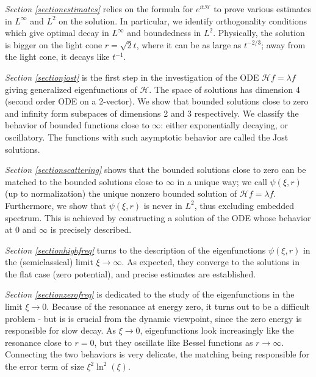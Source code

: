 \documentclass[11 pt]{amsart}
\theoremstyle{definition}
\theoremstyle{remark}
\numberwithin{equation}{section}
\begin{document}
\smallskip

\textit{Section \ref{sectionestimates}}
relies on the formula for $e^{it\mathcal{H}}$ to prove various estimates in $L^\infty$ and $L^2$ on the solution. In particular, we identify orthogonality conditions which give optimal decay in $L^\infty$ and boundedness in $L^2$. Physically, the solution is bigger on the light cone $r = \sqrt 2 t$, where it can be as large as $t^{-2/3}$; away from the light cone, it decays like $t^{-1}$.

\smallskip 

\textit{Section \ref{sectionjost}} is the first step in the investigation of the ODE $\mathcal{H} f = \lambda f$ giving generalized eigenfunctions of $\mathcal{H}$. The space of solutions has dimension 4 (second order ODE on a 2-vector). We show that bounded solutions close to zero and infinity form subspaces of dimensions 2 and 3 respectively. We classify the behavior of bounded functions close to $\infty$: either exponentially decaying, or oscillatory. The functions with such asymptotic behavior are called the Jost solutions.

\smallskip 

\textit{Section \ref{sectionscattering}} shows that the bounded solutions close to zero can be matched to the bounded solutions close to $\infty$ in a unique way; we call $\psi(\xi,r)$ (up to normalization) the unique nonzero bounded solution of $\mathcal{H} f = \lambda f$. Furthermore, we show that $\psi(\xi,r)$ is never in $L^2$, thus excluding embedded spectrum. This is achieved by constructing a solution of the ODE whose behavior at $0$ and $\infty$ is precisely described.

\smallskip 

\textit{Section \ref{sectionhighfreq}} turns to the description of the eigenfunctions $\psi(\xi,r)$ in the (semiclassical) limit $\xi \to \infty$. As expected, they converge to the solutions in the flat case (zero potential), and precise estimates are established.

\smallskip

\textit{Section \ref{sectionzerofreq}} is dedicated to the study of the eigenfunctions in the limit $\xi \to 0$. Because of the resonance at energy zero, it turns out to be a difficult problem - but is is crucial from the dynamic viewpoint, since the zero energy is responsible for slow decay. As $\xi \to 0$, eigenfunctions look increasingly like the resonance close to $r=0$, but they oscillate like Bessel functions as $r \to \infty$. Connecting the two behaviors is very delicate, the matching being responsible for the error term of size $\xi^2 \ln^2(\xi)$.
\end{document}
